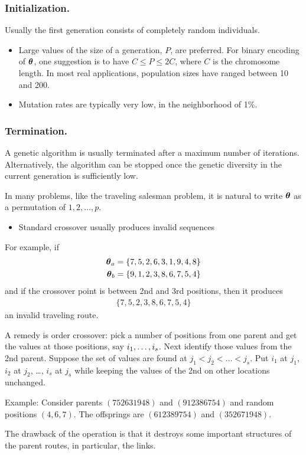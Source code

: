 \begin{frame}
  \frametitle{Initialization.}

  Usually the first generation consists of
  completely random individuals.

  \begin{itemize}
  \item Large values of the size of a generation, $P$, are preferred.
    For binary encoding of $\boldsymbol{\theta}$, one suggestion is to have
    $C\le P\le 2C$, where $C$ is the chromosome length.  In most real
    applications, population sizes have ranged between 10 and 200.
  \item Mutation rates are typically very low, in the neighborhood of
    1\%.
  \end{itemize}
\end{frame}

\begin{frame}
  \frametitle{Termination.}  A genetic algorithm is usually terminated
  after a maximum number of iterations.  Alternatively, the algorithm
  can be stopped once the genetic diversity in the current generation
  is sufficiently low.
\end{frame}


\begin{frame}
  In many problems, like the traveling salesman problem, it is natural
  to write $\boldsymbol{\theta}$ as a permutation of $1, 2, \ldots, p$.
  \begin{itemize}
  \item Standard crossover usually produces invalid sequences
  \end{itemize}
  For example, if
  \begin{align*}
    \boldsymbol{\theta}_a
    &
      = \{7, 5, 2, 6, 3, 1, 9, 4, 8\} \\
    \boldsymbol{\theta}_b
    &
      = \{9, 1, 2, 3, 8, 6, 7, 5, 4\}
  \end{align*}
  and if the crossover point is between 2nd and 3rd positions, then it
  produces
  \begin{align*}
    \{7, 5, 2, 3, 8, 6, 7, 5, 4\}
  \end{align*}
  an invalid traveling route.
\end{frame}


\begin{frame}
  A remedy is order crossover: pick a number of positions from one
  parent and get the values at those positions, say ${i}_1, \ldots, {i}_{s}$.  Next
  identify those values from the 2nd parent.  Suppose the set of
  values are found at $j_1<j_2<\ldots<j_s$.  Put $i_1$ at $j_1$, $i_2$
  at $j_2$, \ldots, $i_s$ at $j_s$ while keeping the values of the 2nd
  on other locations unchanged.

  Example: Consider parents $(752631948)$ and $(912386754)$ and random
  positions $(4, 6, 7)$. The offsprings are
  $(612389754)$ and $(352671948)$.

  The drawback of the operation is that it destroys some important
  structures of the parent routes, in particular, the links.

\end{frame}


